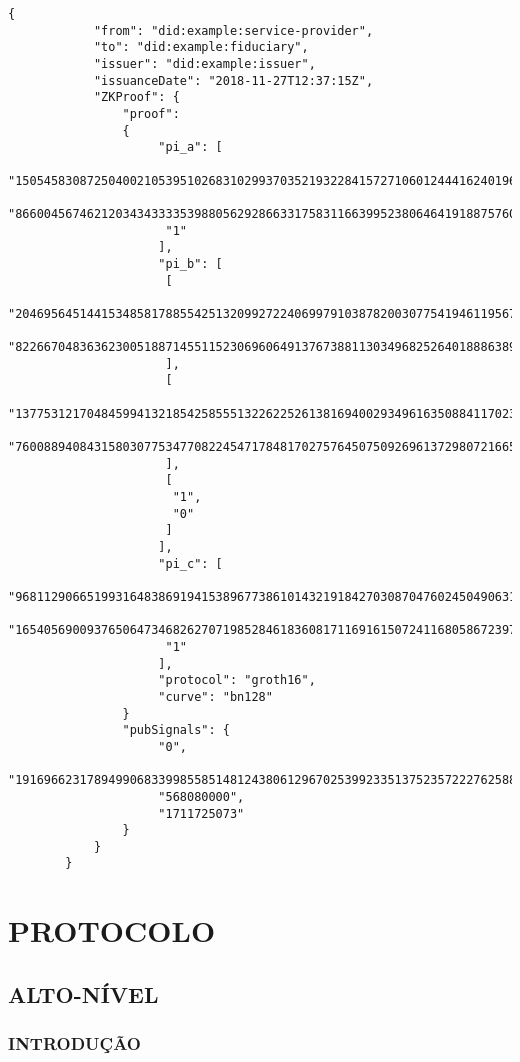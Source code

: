 \newpage    
    \begin{lstlisting}[language=code, caption=Exemplo para a mensagem auth-response, label=input-label]
        {
            "from": "did:example:service-provider",
            "to": "did:example:fiduciary",
            "issuer": "did:example:issuer",
            "issuanceDate": "2018-11-27T12:37:15Z",
            "ZKProof": {
                "proof":
                {
                     "pi_a": [
                      "15054583087250400210539510268310299370352193228415727106012444162401960987255",
                      "8660045674621203434333353988056292866331758311663995238064641918875760339323",
                      "1"
                     ],
                     "pi_b": [
                      [
                       "20469564514415348581788554251320992722406997910387820030775419461195670848757",
                       "8226670483636230051887145511523069606491376738811303496825264018886389545639"
                      ],
                      [
                       "13775312170484599413218542585551322622526138169400293496163508841170235822115",
                       "7600889408431580307753477082245471784817027576450750926961372980721665697449"
                      ],
                      [
                       "1",
                       "0"
                      ]
                     ],
                     "pi_c": [
                      "9681129066519931648386919415389677386101432191842703087047602450490631444771",
                      "16540569009376506473468262707198528461836081711691615072411680586723972264887",
                      "1"
                     ],
                     "protocol": "groth16",
                     "curve": "bn128"
                }            
                "pubSignals": {
                     "0",
                     "19169662317894990683399855851481243806129670253992335137523572227625886599311",
                     "568080000",
                     "1711725073"
                } 
            }
        }
    \end{lstlisting}

\newpage
\section{PROTOCOLO}
\subsection{ALTO-NÍVEL}
\subsubsection{INTRODUÇÃO}

